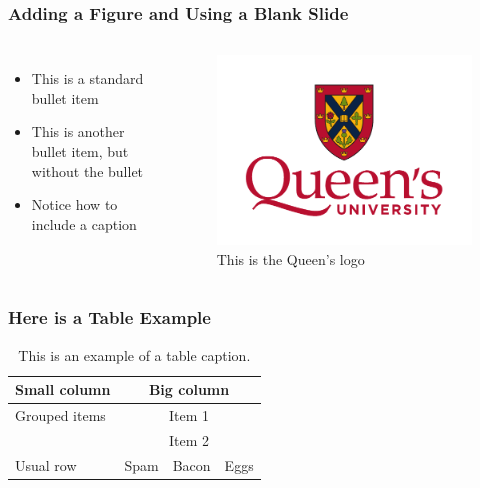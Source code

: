 \documentclass[fleqn]{qu-slides}
\begin{document}

\SlideWhite
\begin{frame}
    \frametitle{Adding a Figure and Using a Blank Slide}
    \begin{columns}
        \begin{itemize}
            \item This is a standard bullet item
            \item[] This is another bullet item, but without the bullet
            \item Notice how to include a caption
        \end{itemize}
        \begin{figure}
            \flushleft
            \includegraphics[width=1.0\columnwidth]{logo/qu-logo-vertical-colour.pdf}
            \caption{This is the Queen's logo}
        \end{figure}
    \end{columns}
\end{frame}


\SlideWhite
\begin{frame}
    \frametitle{Here is a Table Example}
    \begin{table}
        \caption{This is an example of a table caption.}
        \flushleft
        \begin{tabular}{lccc}
            \toprule
                \bf Small column & \multicolumn{3}{c}{\bf Big column} \\
            \midrule
                Grouped items & \multicolumn{3}{c}{Item 1} \\
            \cmidrule{2-4}
                & \multicolumn{3}{c}{Item 2} \\
            \midrule
                Usual row & Spam & Bacon & Eggs \\
            \bottomrule
        \end{tabular}
    \end{table}
\end{frame}
\end{document}
